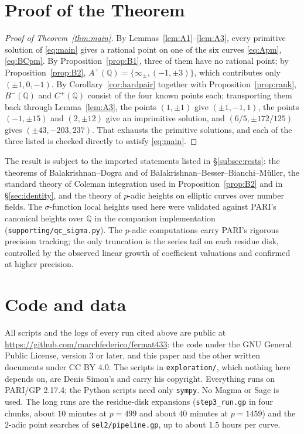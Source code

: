 \documentclass[11pt,reqno]{amsart}
\theoremstyle{plain}
\theoremstyle{definition}
\newcommand{\Q}{\mathbb{Q}}
\numberwithin{equation}{section}
\begin{document}
\section{Proof of the Theorem}\label{sec:conclusion}

\begin{proof}[Proof of Theorem~\ref{thm:main}]
By Lemmas~\ref{lem:A1}--\ref{lem:A3}, every primitive solution of
\eqref{eq:main} gives a rational point on one of the six curves \eqref{eq:Apm},
\eqref{eq:BCpm}. By Proposition~\ref{prop:B1}, three of them have no rational
point; by Proposition~\ref{prop:B2}, $A^{+}(\Q)=\{\infty_{\pm},(-1,\pm3)\}$,
which contributes only $(\pm1,0,-1)$. By Corollary~\ref{cor:hardpair} together
with Proposition~\ref{prop:rank}, $B^{-}(\Q)$ and $C^{+}(\Q)$ consist of the
four known points each; transporting them back through Lemma~\ref{lem:A3},
the points $(1,\pm1)$ give $(\pm1,-1,1)$, the points $(-1,\pm15)$ and
$(2,\pm12)$ give an imprimitive solution, and $(6/5,\pm172/125)$ gives
$(\pm43,-203,237)$. That exhausts the primitive solutions, and each of the three
listed is checked directly to satisfy \eqref{eq:main}.
\end{proof}

The result is subject to the imported statements listed in
\S\ref{subsec:rests}: the theorems of Balakrishnan--Dogra and of
Balakrishnan--Besser--Bianchi--M\"uller, the standard theory of Coleman
integration used in Proposition~\ref{prop:B2} and in \S\ref{sec:identity}, and
the theory of $p$-adic heights on elliptic curves over number fields. The
$\sigma$-function local heights used here were validated against PARI's
canonical heights over $\Q$ in the companion implementation
(\texttt{supporting/qc\_sigma.py}). The $p$-adic computations carry PARI's
rigorous precision tracking; the only truncation is the series tail on each
residue disk, controlled by the observed linear growth of coefficient valuations
and confirmed at higher precision.

\section{Code and data}\label{sec:code}

All scripts and the logs of every run cited above are public at
\url{https://github.com/marchfederico/fermat433}: the code under the GNU
General Public License, version 3 or later, and this paper and the other
written documents under CC BY 4.0. The scripts in \texttt{exploration/}, which
nothing here depends on, are Denis Simon's and carry his copyright.
Everything runs on PARI/GP
2.17.4; the Python scripts need only \texttt{sympy}. No Magma or Sage is used.
The long runs are the residue-disk expansions (\texttt{step3\_run.gp} in four
chunks, about $10$ minutes at $p=499$ and about $40$ minutes at $p=1459$) and
the $2$-adic point searches of \texttt{sel2/pipeline.gp}, up to about $1.5$
hours per curve.
\end{document}
